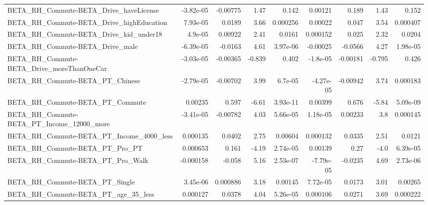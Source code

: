\begin{tabular}{lrrrrrrrr}
BETA\_RH\_Commute-BETA\_Drive\_haveLicense             &   -3.82e-05 &     -0.00775 &      1.47 &    0.142 &    0.00121 &       0.189 &         1.43 &         0.152 \\
BETA\_RH\_Commute-BETA\_Drive\_highEducation           &    7.93e-05 &       0.0189 &      3.66 & 0.000256 &    0.00022 &       0.047 &         3.54 &      0.000407 \\
BETA\_RH\_Commute-BETA\_Drive\_kid\_under18             &     4.9e-05 &      0.00922 &      2.41 &   0.0161 &   0.000152 &       0.025 &         2.32 &        0.0204 \\
BETA\_RH\_Commute-BETA\_Drive\_male                    &   -6.39e-05 &      -0.0163 &      4.61 & 3.97e-06 &   -0.00025 &     -0.0566 &         4.27 &      1.98e-05 \\
BETA\_RH\_Commute-BETA\_Drive\_moreThanOneCar          &   -3.03e-05 &     -0.00365 &    -0.839 &    0.402 &   -1.8e-05 &    -0.00181 &       -0.795 &         0.426 \\
BETA\_RH\_Commute-BETA\_PT\_Chinese                    &   -2.79e-05 &     -0.00702 &      3.99 &  6.7e-05 &  -4.27e-05 &    -0.00942 &         3.74 &      0.000183 \\
BETA\_RH\_Commute-BETA\_PT\_Commute                    &     0.00235 &        0.597 &     -6.61 & 3.93e-11 &    0.00399 &       0.676 &        -5.84 &      5.09e-09 \\
BETA\_RH\_Commute-BETA\_PT\_Income\_12000\_more          &   -3.41e-05 &     -0.00782 &      4.03 & 5.66e-05 &   1.18e-05 &     0.00233 &          3.8 &      0.000145 \\
BETA\_RH\_Commute-BETA\_PT\_Income\_4000\_less           &    0.000135 &       0.0402 &      2.75 &  0.00604 &   0.000132 &      0.0335 &         2.51 &        0.0121 \\
BETA\_RH\_Commute-BETA\_PT\_Pro\_PT                     &    0.000653 &        0.161 &     -4.19 & 2.74e-05 &    0.00139 &        0.27 &         -4.0 &      6.39e-05 \\
BETA\_RH\_Commute-BETA\_PT\_Pro\_Walk                   &   -0.000158 &       -0.058 &      5.16 & 2.53e-07 &  -7.79e-05 &     -0.0235 &         4.69 &      2.73e-06 \\
BETA\_RH\_Commute-BETA\_PT\_Single                     &    3.45e-06 &     0.000886 &      3.18 &  0.00145 &   7.72e-05 &      0.0173 &         3.01 &       0.00265 \\
BETA\_RH\_Commute-BETA\_PT\_age\_35\_less                &    0.000127 &       0.0378 &      4.04 & 5.26e-05 &   0.000106 &      0.0271 &         3.69 &      0.000222 \\

\end{tabular}
